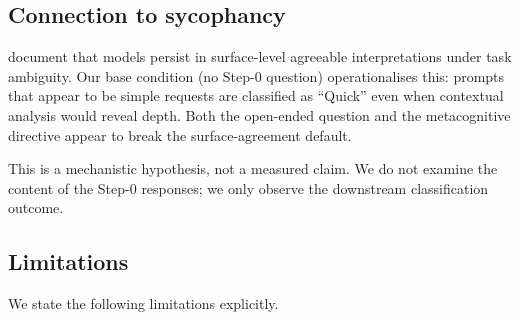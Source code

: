 \documentclass[11pt,a4paper]{article}
\begin{document}
\subsection{Connection to sycophancy}

\citet{SycEval2025} document that models persist in surface-level agreeable
interpretations under task ambiguity.  Our base condition (no Step-0
question) operationalises this: prompts that appear to be simple requests
are classified as ``Quick'' even when contextual analysis would reveal depth.
Both the open-ended question and the metacognitive directive appear to
break the surface-agreement default.

This is a mechanistic hypothesis, not a measured claim.  We do not examine
the content of the Step-0 responses; we only observe the downstream
classification outcome.

\subsection{Limitations}
\label{sec:limitations}

We state the following limitations explicitly.
\end{document}
